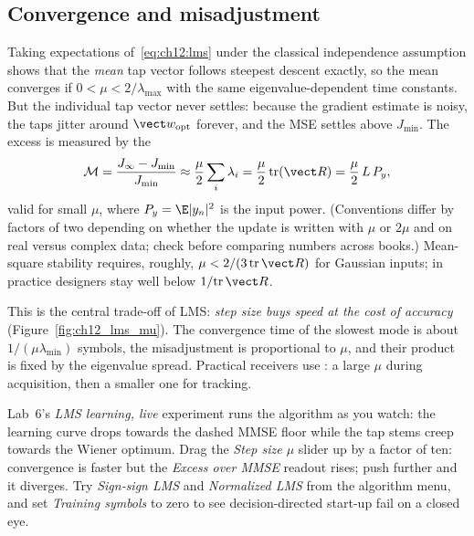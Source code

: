 \subsection{Convergence and misadjustment}

Taking expectations of~\eqref{eq:ch12:lms} under the classical independence assumption shows that
the \emph{mean} tap vector follows steepest descent exactly, so the mean converges if
$0<\mu<2/\lambda_{\max}$ with the same eigenvalue-dependent time constants. But the individual tap
vector never settles: because the gradient estimate is noisy, the taps jitter around
$\vect w_{\mathrm{opt}}$ forever, and the MSE settles above $J_{\min}$. The excess is measured by
the 
\begin{equation}
\mathcal M=\frac{J_\infty-J_{\min}}{J_{\min}}\approx\frac{\mu}{2}\sum_i\lambda_i
=\frac{\mu}{2}\,\mathrm{tr}(\vect R)=\frac{\mu}{2}\,L\,P_y,
\label{eq:ch12:misadj}
\end{equation}
valid for small $\mu$, where $P_y=\E|y_n|^2$ is the input power. (Conventions differ by factors of
two depending on whether the update is written with $\mu$ or $2\mu$ and on real versus complex
data; check before comparing numbers across books.) Mean-square stability requires, roughly,
$\mu<2/(3\,\mathrm{tr}\,\vect R)$ for Gaussian inputs; in practice designers stay well below
$1/\mathrm{tr}\,\vect R$.

This is the central trade-off of LMS: \emph{step size buys speed at the cost of accuracy}
(Figure~\ref{fig:ch12_lms_mu}). The convergence time of the slowest mode is about
$1/(\mu\lambda_{\min})$ symbols, the misadjustment is proportional to $\mu$, and their product is
fixed by the eigenvalue spread. Practical receivers use : a large $\mu$ during
acquisition, then a smaller one for tracking.


\begin{tryit}
Lab~6's \emph{LMS learning, live} experiment runs the algorithm as you watch: the learning curve
drops towards the dashed MMSE floor while the tap stems creep towards the Wiener optimum. Drag the
\emph{Step size $\mu$} slider up by a factor of ten: convergence is faster but the \emph{Excess over
MMSE} readout rises; push further and it diverges. Try \emph{Sign-sign LMS} and \emph{Normalized
LMS} from the algorithm menu, and set \emph{Training symbols} to zero to see decision-directed
start-up fail on a closed eye.
\end{tryit}

